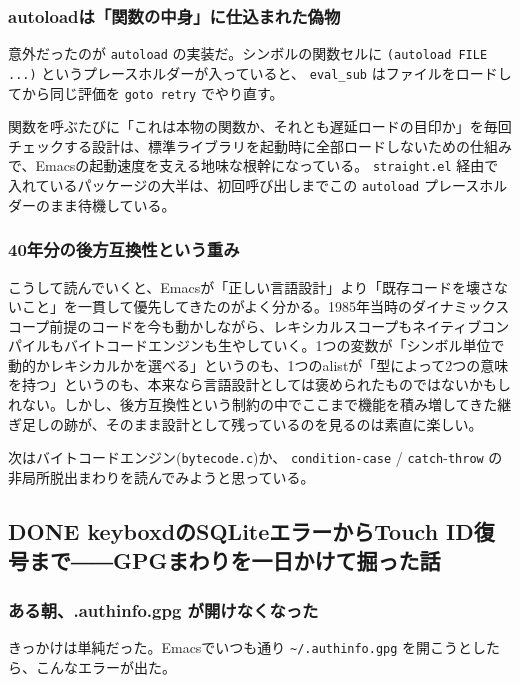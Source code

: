 \documentclass[11pt]{article}
\begin{document}
\subsubsection{autoloadは「関数の中身」に仕込まれた偽物}
\label{sec:orgc556929}

意外だったのが \texttt{autoload} の実装だ。シンボルの関数セルに \texttt{(autoload FILE ...)} というプレースホルダーが入っていると、 \texttt{eval\_sub} はファイルをロードしてから同じ評価を \texttt{goto retry} でやり直す。

関数を呼ぶたびに「これは本物の関数か、それとも遅延ロードの目印か」を毎回チェックする設計は、標準ライブラリを起動時に全部ロードしないための仕組みで、Emacsの起動速度を支える地味な根幹になっている。 \texttt{straight.el} 経由で入れているパッケージの大半は、初回呼び出しまでこの \texttt{autoload} プレースホルダーのまま待機している。
\subsubsection{40年分の後方互換性という重み}
\label{sec:org1da72fd}

こうして読んでいくと、Emacsが「正しい言語設計」より「既存コードを壊さないこと」を一貫して優先してきたのがよく分かる。1985年当時のダイナミックスコープ前提のコードを今も動かしながら、レキシカルスコープもネイティブコンパイルもバイトコードエンジンも生やしていく。1つの変数が「シンボル単位で動的かレキシカルかを選べる」というのも、1つのalistが「型によって2つの意味を持つ」というのも、本来なら言語設計としては褒められたものではないかもしれない。しかし、後方互換性という制約の中でここまで機能を積み増してきた継ぎ足しの跡が、そのまま設計として残っているのを見るのは素直に楽しい。

次はバイトコードエンジン(\texttt{bytecode.c})か、 \texttt{condition-case} / \texttt{catch}-\texttt{throw} の非局所脱出まわりを読んでみようと思っている。
\subsection{{\bfseries\sffamily DONE} keyboxdのSQLiteエラーからTouch ID復号まで――GPGまわりを一日かけて掘った話}
\label{sec:org5afcb48}
\subsubsection{ある朝、.authinfo.gpg が開けなくなった}
\label{sec:org23f73c1}

きっかけは単純だった。Emacsでいつも通り \texttt{\textasciitilde{}/.authinfo.gpg} を開こうとしたら、こんなエラーが出た。
\end{document}
